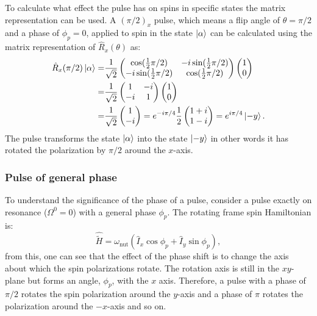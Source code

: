 To calculate what effect the pulse has on spins in specific states the matrix representation can be used.
A $(\pi/2)_x$ pulse, which means a flip angle of $\theta = \pi/2$ and a phase of $\phi_p = 0$, applied to spin in the state $\ket{\alpha}$ can be calculated using the matrix representation of $\hat{R}_x(\theta)$  as:
\begin{align}
  \hat{R}_x(\pi/2)\ket{\alpha} =& \frac{1}{\sqrt{2}}\begin{pmatrix}
     \cos(\frac{1}{2}\pi/2) & -i\sin(\frac{1}{2}\pi/2)\\
     -i\sin(\frac{1}{2}\pi/2) & \cos(\frac{1}{2}\pi/2)
\end{pmatrix}\begin{pmatrix}
  1\\
  0
\end{pmatrix}\\ =& \frac{1}{\sqrt{2}}\begin{pmatrix}
  1 & -i\\
  -i & 1
\end{pmatrix}\begin{pmatrix}
  1\\
  0
\end{pmatrix}\\ =& \frac{1}{\sqrt{2}}\begin{pmatrix}
  1\\
  -i
\end{pmatrix} = e^{-i\pi/4}\frac{1}{2}\begin{pmatrix}
  1+i\\
  1-i
\end{pmatrix} = e^{i\pi/4}\ket{-y}.
\end{align}
The pulse transforms the state $\ket{\alpha}$ into the state $\ket{-y}$ in other words
it has rotated the polarization by $\pi/2$ around the $x$-axis.


\subsubsection{Pulse of general phase}

To understand the significance of the phase of a pulse, consider a pulse exactly on resonance
($\Omega^0 = 0$) with a general phase $\phi_p$. The rotating frame spin Hamiltonian is:
\begin{equation}
  \hat{\tilde{H}} = \omega_{\text{nut}}(\hat{I}_x\cos\phi_p + \hat{I}_y\sin\phi_p),
\end{equation}
from this, one can see that the effect of the phase shift is to change the axis about
which the spin polarizations rotate. The rotation axis is still in the $xy$-plane but forms
an angle, $\phi_p$, with the $x$ axis. Therefore, a pulse with a phase of $\pi/2$ rotates the spin
polarization around the $y$-axis and a phase of $\pi$ rotates the polarization around the $-x$-axis and
so on.

